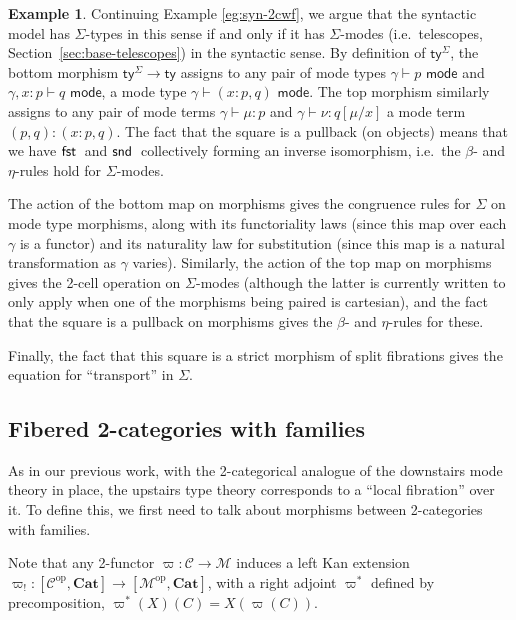 \documentclass[10pt]{article}
\theoremstyle{definition}
\newtheorem{example}{Example}
\newcommand\dsd[1]{\ensuremath{\mathsf{#1}}}
\newcommand{\yields}{\vdash}
\newcommand{\type}{\,\,\mathsf{mode}}
\newcommand{\app}[2]{\ensuremath{#1 \: #2}}
\newcommand{\sigmacl}[3]{\ensuremath{(#1{:}#2,#3)}}
\newcommand{\fst}[1]{\app{\dsd{fst}}{#1}}
\newcommand{\snd}[1]{\app{\dsd{snd}}{#1}}
\newcommand\op{^{\mathrm{op}}}
\newcommand\Cat{\mathbf{Cat}}
\newcommand\M{\mathcal{M}}
\newcommand\Mty{\mathsf{ty}}
\newcommand\MtySig{\mathsf{ty}^{\Sigma}}
\newcommand\C{\mathcal{C}}
\newcommand\vp{\varpi}
\newcommand\vpst{\vp^*}
\newcommand\vpsh{\vp_!}
\begin{document}
\begin{example}\label{eg:syn-sig}
  Continuing Example \ref{eg:syn-2cwf}, we argue that the syntactic model has $\Sigma$-types in this sense if and only if it has $\Sigma$-modes (i.e.\ telescopes, Section~\ref{sec:base-telescopes}) in the syntactic sense.
  By definition of $\MtySig$, the bottom morphism $\MtySig \to \Mty$ assigns to any pair of mode types $\gamma\yields p\type$ and $\gamma,x:p \yields q \type$, a mode type $\gamma \yields \sigmacl{x}{p}{q} \type$.
  The top morphism similarly assigns to any pair of mode terms $\gamma \yields \mu : p$ and $\gamma \yields \nu : q[\mu/x]$ a mode term $(p,q):\sigmacl{x}{p}{q}$.
  The fact that the square is a pullback (on objects) means that we have $\fst$ and $\snd$ collectively forming an inverse isomorphism, i.e.\ the $\beta$- and $\eta$-rules hold for $\Sigma$-modes.

  The action of the bottom map on morphisms gives the congruence rules for $\Sigma$ on mode type morphisms, along with its functoriality laws (since this map over each $\gamma$ is a functor) and its naturality law for substitution (since this map is a natural transformation as $\gamma$ varies).
  Similarly, the action of the top map on morphisms gives the 2-cell operation on $\Sigma$-modes (although the latter is currently written to only apply when one of the morphisms being paired is cartesian), and the fact that the square is a pullback on morphisms gives the $\beta$- and $\eta$-rules for these.

  Finally, the fact that this square is a strict morphism of split fibrations gives the equation for ``transport'' in $\Sigma$.
\end{example}


\subsection{Fibered 2-categories with families}
\label{sec:fib-2cwf}

As in our previous work, with the 2-categorical analogue of the downstairs mode theory in place, the upstairs type theory corresponds to a ``local fibration'' over it.
To define this, we first need to talk about morphisms between 2-categories with families.

Note that any 2-functor $\vp:\C\to\M$ induces a left Kan extension $\vpsh : [\C\op,\Cat] \to [\M\op,\Cat]$, with a right adjoint $\vpst$ defined by precomposition, $\vpst(X)(C) = X(\vp(C))$.
\end{document}
